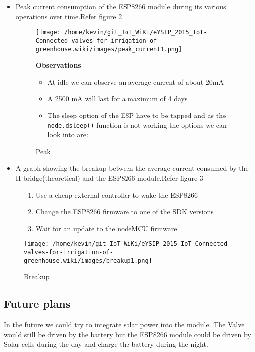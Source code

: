 \documentclass[16pt]{article}
\begin{document}
\begin{itemize}
\item
  Peak current consumption of the ESP8266 module during its various
  operations over time.Refer figure 2 

\begin{figure}
\texttt{[image: /home/kevin/git\_IoT\_WiKi/eYSIP\_2015\_IoT-Connected-valves-for-irrigation-of-greenhouse.wiki/images/peak\_current1.png]}
\caption{Peak}
\textbf{Observations}

\begin{itemize}

\item
  At idle we can observe an average current of about 20mA
\item
  A 2500 mA will last for a maximum of 4 days
\item
  The sleep option of the ESP have to be tapped and as the \\
 \texttt{node.dsleep()} function is not working the options we can look
  into are:
\end{itemize}
\end{figure}

  
\item
  A graph showing the breakup between the average current consumed by
  the H-bridge(theoretical) and the ESP8266 module.Refer figure 3
\end{itemize}

\begin{figure}
\begin{enumerate}

\item
  Use a cheap external controller to wake the ESP8266
\item
  Change the ESP8266 firmware to one of the SDK versions
\item
  Wait for an update to the nodeMCU firmware
\end{enumerate}
\texttt{[image: /home/kevin/git\_IoT\_WiKi/eYSIP\_2015\_IoT-Connected-valves-for-irrigation-of-greenhouse.wiki/images/breakup1.png]}
\caption{Breakup}
\end{figure}
  



\vspace{0.5cm}
\subsection{Future plans}

\vspace{0.3cm}
In the future we could try to integrate solar power into the module. The
Valve would still be driven by the battery but the ESP8266 module could
be driven by Solar cells during the day and charge the battery during
the night.
\end{document}
